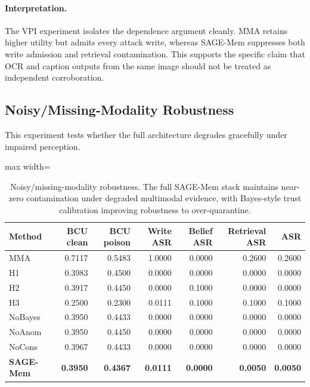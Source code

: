 \documentclass{article}
\begin{document}
\paragraph{Interpretation.}
The VPI experiment isolates the dependence argument cleanly. MMA retains higher utility but admits every attack write, whereas SAGE-Mem suppresses both write admission and retrieval contamination. This supports the specific claim that OCR and caption outputs from the same image should not be treated as independent corroboration.

\subsection{Noisy/Missing-Modality Robustness}

This experiment tests whether the full architecture degrades gracefully under impaired perception.

\begin{table}[t]
\centering
\small
\setlength{\tabcolsep}{3.5pt}
\renewcommand{\arraystretch}{0.96}
\begin{adjustbox}{max width=\columnwidth}
\begin{tabular}{lrrrrrr}
\toprule
Method & BCU clean & BCU poison & Write ASR & Belief ASR & Retrieval ASR & ASR \\
\midrule
MMA & 0.7117 & 0.5483 & 1.0000 & 0.0000 & 0.2600 & 0.2600 \\
H1 & 0.3983 & 0.4500 & 0.0000 & 0.0000 & 0.0000 & 0.0000 \\
H2 & 0.3917 & 0.4450 & 0.0000 & 0.1000 & 0.0000 & 0.0000 \\
H3 & 0.2500 & 0.2300 & 0.0111 & 0.1000 & 0.1000 & 0.1000 \\
NoBayes & 0.3950 & 0.4433 & 0.0000 & 0.0000 & 0.0000 & 0.0000 \\
NoAnom & 0.3950 & 0.4450 & 0.0000 & 0.0000 & 0.0000 & 0.0000 \\
NoCons & 0.3967 & 0.4433 & 0.0000 & 0.0000 & 0.0000 & 0.0000 \\
\textbf{SAGE-Mem} & \textbf{0.3950} & \textbf{0.4367} & \textbf{0.0111} & \textbf{0.0000} & \textbf{0.0050} & \textbf{0.0050} \\
\bottomrule
\end{tabular}
\end{adjustbox}
\caption{Noisy/missing-modality robustness. The full SAGE-Mem stack maintains near-zero contamination under degraded multimodal evidence, with Bayes-style trust calibration improving robustness to over-quarantine.}
\label{tab:locomo-noisy}
\end{table}
\end{document}
